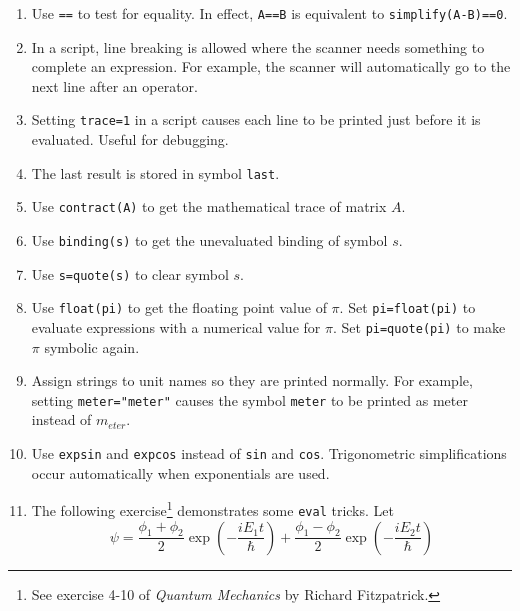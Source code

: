 \documentclass[12pt]{article}
\begin{document}
\begin{enumerate}

\item
Use \verb$==$ to test for equality.
In effect, \verb$A==B$ is equivalent to \verb$simplify(A-B)==0$.

\item
In a script, line breaking is allowed where the scanner needs something to complete an expression.
For example, the scanner will automatically go to the next line after an operator.

\item
Setting \verb$trace=1$ in a script causes each line to be printed just before it is evaluated.
Useful for debugging.

\item
The last result is stored in symbol \verb$last$.

\item
Use \verb$contract(A)$ to get the mathematical trace of matrix $A$.

\item
Use \verb$binding(s)$ to get the unevaluated binding of symbol $s$.

\item
Use \verb$s=quote(s)$ to clear symbol $s$.

\item
Use \verb$float(pi)$ to get the floating point value of $\pi$.
Set \verb$pi=float(pi)$ to evaluate expressions with a numerical value for $\pi$.
Set \verb$pi=quote(pi)$ to make $\pi$ symbolic again.

\item
Assign strings to unit names so they are printed normally.
For example, setting \verb$meter="meter"$ causes the symbol \verb$meter$
to be printed as meter instead of $m_{eter}$.

\item
Use \verb$expsin$ and \verb$expcos$ instead of \verb$sin$ and \verb$cos$.
Trigonometric simplifications occur automatically when exponentials are used.

\item
The following exercise\footnote{See exercise 4-10 of {\it Quantum Mechanics} by Richard Fitzpatrick.}
demonstrates some \verb$eval$ tricks.
Let
\begin{equation*}
\psi
=\frac{\phi_1+\phi_2}{2}\exp\left(-\frac{iE_1t}{\hbar}\right)
+\frac{\phi_1-\phi_2}{2}\exp\left(-\frac{iE_2t}{\hbar}\right)
\end{equation*}


\end{enumerate}
\end{document}
